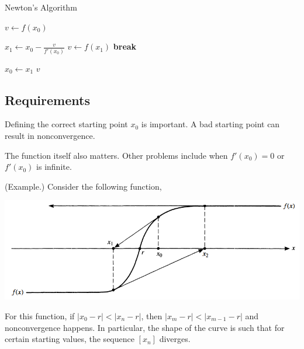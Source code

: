 \documentclass[letterpaper]{article}
\begin{document}
\begin{algorithm}[H]
    \caption{Newton's Algorithm}
    \label{alg:two}
    \begin{algorithmic}[1]
            \State $v \gets f(x_0)$
                \State \Return 
            \EndIf

                \State $x_1 \gets x_0 - \frac{v}{f'(x_0)}$
                \State $v \gets f(x_1)$
                    \State \textbf{break}
                \EndIf

                \State $x_0 \gets x_1$
            \EndFor 
            \State \Return $v$
        \EndFunction
    \end{algorithmic}
\end{algorithm}

\subsection{Requirements}
Defining the correct starting point $x_0$ is important. A bad starting point can result in nonconvergence.

\bigskip 

The function itself also matters. Other problems include when $f'(x_0) = 0$ or $f'(x_0)$ is infinite.

\begin{mdframed}
    (Example.) Consider the following function, 

    \begin{center}
        \includegraphics[scale=0.6]{../assets/newton_bad.png}
    \end{center}
    For this function, if $|x_0 - r| < |x_n - r|$, then $|x_m - r| < |x_{m - 1} - r|$ and nonconvergence happens. In particular, the shape of the curve is such that for certain starting values, the sequence $[x_n]$ diverges.
\end{mdframed}
\end{document}
